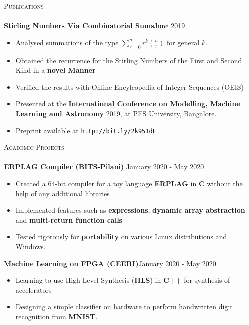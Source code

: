\documentclass[a4paper]{article}
\newcommand{\lineunder} {
    \vspace*{-8pt} \\
    \hspace*{-18pt} \hrulefill \\
}
\newcommand{\header} [1] {
    {\hspace*{-18pt}\vspace*{6pt} \textsc{#1}}
    \vspace*{-6pt} \lineunder
}
\newcommand{\combinesum}[3]{ \displaystyle{\sum_{r=0}^{#1} {r^{#3}} {#1 \choose #2}}}
\begin{document}
\header{Publications}
{\textbf{Stirling Numbers Via Combinatorial Sums}}\hfill June 2019\\
\vspace{-1mm}
\begin{itemize} \itemsep 1pt
    \item Analysed summations of the type $\combinesum{n}{r}{k}$ for general $k$. 
    \item Obtained the recurrence for the Stirling Numbers of the First and Second Kind in a \textbf{novel Manner}
    \item Verified the results with Online Encylcopedia of Integer Sequences (OEIS)
    \item Presented at the \textbf{International Conference on Modelling, Machine Learning and Astronomy} 2019, at PES University, Bangalore.
    \item Preprint available at \texttt{http://bit.ly/2k951dF}
\end{itemize}
\vspace*{2mm}

\header{Academic Projects}
{\textbf{ERPLAG Compiler (BITS-Pilani)}} \hfill January 2020 - May 2020\\
\begin{itemize} \itemsep 1pt
    \item Created a 64-bit compiler for a toy language \textbf{ERPLAG} in \textbf{C} without the help of any additional libraries
    \item Implemented features such as \textbf{expressions}, \textbf{dynamic array abstraction} and \textbf{multi-return function calls}
    \item Tested rigorously for \textbf{portability} on various Linux distributions and Windows.
\end{itemize}
\vspace*{2mm}

{\textbf{Machine Learning on FPGA (CEERI)}}\hfill January 2020 - May 2020\\
\begin{itemize} \itemsep 1pt
    \item Learning to use High Level Synthesis (\textbf{HLS}) in \textbf{C++} for synthesis of accelerators
    \item Designing a simple classifier on hardware to perform handwritten digit recognition from \textbf{MNIST}.
\end{itemize}
\vspace*{2mm}
\end{document}
